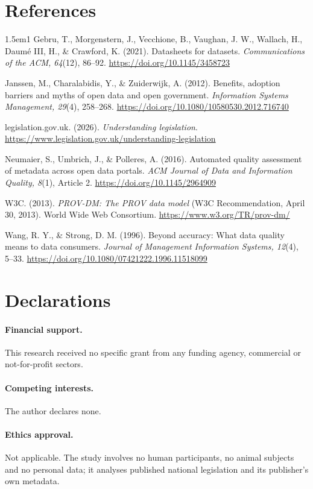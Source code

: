 \documentclass[11pt]{article}
\begin{document}
\section*{References}
\begin{hangparas}{1.5em}{1}
Gebru, T., Morgenstern, J., Vecchione, B., Vaughan, J. W., Wallach, H.,
Daum\'e III, H., \& Crawford, K. (2021). Datasheets for datasets.
\emph{Communications of the ACM, 64}(12), 86--92.
\url{https://doi.org/10.1145/3458723}

Janssen, M., Charalabidis, Y., \& Zuiderwijk, A. (2012). Benefits, adoption
barriers and myths of open data and open government. \emph{Information Systems
Management, 29}(4), 258--268. \url{https://doi.org/10.1080/10580530.2012.716740}

legislation.gov.uk. (2026). \emph{Understanding legislation}.
\url{https://www.legislation.gov.uk/understanding-legislation}

Neumaier, S., Umbrich, J., \& Polleres, A. (2016). Automated quality assessment
of metadata across open data portals. \emph{ACM Journal of Data and Information
Quality, 8}(1), Article 2. \url{https://doi.org/10.1145/2964909}

W3C. (2013). \emph{PROV-DM: The PROV data model} (W3C Recommendation, April 30,
2013). World Wide Web Consortium. \url{https://www.w3.org/TR/prov-dm/}

Wang, R. Y., \& Strong, D. M. (1996). Beyond accuracy: What data quality means
to data consumers. \emph{Journal of Management Information Systems, 12}(4),
5--33. \url{https://doi.org/10.1080/07421222.1996.11518099}
\end{hangparas}

\section*{Declarations}

\paragraph{Financial support.} This research received no specific grant from
any funding agency, commercial or not-for-profit sectors.

\paragraph{Competing interests.} The author declares none.

\paragraph{Ethics approval.} Not applicable. The study involves no human
participants, no animal subjects and no personal data; it analyses published
national legislation and its publisher's own metadata.
\end{document}
